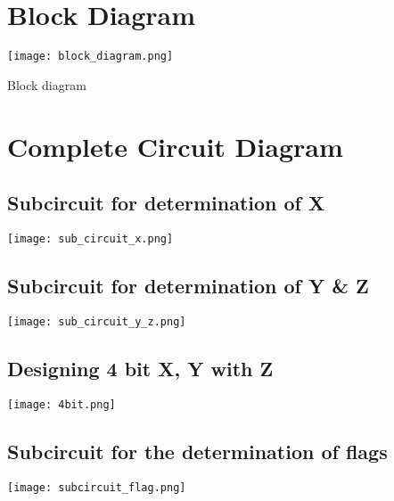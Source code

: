 \documentclass[12pt]{article}
\begin{document}
\renewcommand{\arraystretch}{1}


\section{Block Diagram}
\begin{center}
    \texttt{[image: block\_diagram.png]}
    \caption{Block diagram}
    \label{fig:my_label}
\end{center}


\section{Complete Circuit Diagram}

\subsection{ Subcircuit for determination of X}
\begin{center}
    \texttt{[image: sub\_circuit\_x.png]}
    \label{fig:my_label}
\end{center}

\subsection{Subcircuit for determination of Y \& Z }
\begin{center}
    \texttt{[image: sub\_circuit\_y\_z.png]}
    \label{fig:my_label}
\end{center}

\subsection{Designing 4 bit X, Y with Z }
\begin{center}
    \texttt{[image: 4bit.png]}
    \label{fig:my_label}
\end{center}

\subsection{ Subcircuit for the determination of flags}
\begin{center}
    \texttt{[image: subcircuit\_flag.png]}
    \label{fig:my_label}
\end{center}
\end{document}
